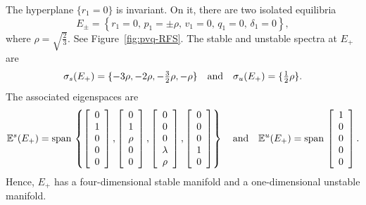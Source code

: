 \documentclass[11pt]{article}
\numberwithin{equation}{section}
\begin{document}
The hyperplane $\{ r_1 = 0 \}$ is invariant.
On it, there are two isolated equilibria
\begin{equation}\label{eq:Epm}
 E_{\pm} = \left\{ r_1=0, \, p_1 = \pm\rho, \, v_1=0, \, q_1=0, \, \delta_1=0 \right\},
\end{equation}
where $\rho=\sqrt{\tfrac{2}{3}}$. 
See Figure~\ref{fig:pvq-RFS}. 
The stable and unstable spectra at $E_{+}$ are 
\begin{equation*}
\sigma_s(E_{+}) = \{  -3\rho, -2\rho, 
-\tfrac{3}{2}\rho,
-\rho \} \quad
{\rm and} \quad 
\sigma_u(E_{+}) = \{ \tfrac{1}{2}\rho \}.
\end{equation*}
The associated eigenspaces are 
\begin{equation*}
\mathbb{E}^s(E_+)
    = {\rm span} \, \left\{ 
    \left[
      \begin{array}{c}
      0 \\ 1 \\ 0 \\ 0 \\ 0
      \end{array}
      \right],
       \left[
      \begin{array}{c}
      0 \\ 1 \\ \rho \\ 0 \\ 0
      \end{array}
      \right],
      \left[
      \begin{array}{c}
      0 \\ 0 \\ 0 \\ \lambda \\ \rho
      \end{array}
      \right],     
      \left[
      \begin{array}{c}
      0 \\ 0 \\ 0 \\ 1 \\ 0
      \end{array}
      \right]
      \right\}
      \quad {\rm and} \quad 
       \mathbb{E}^u(E_{+}) 
    = {\rm span} \, \left[
      \begin{array}{c}
      1 \\ 0 \\ 0 \\ 0 \\ 0
      \end{array}
      \right].
\end{equation*}
Hence, $E_{+}$ has a four-dimensional stable manifold and a one-dimensional unstable manifold.
\end{document}
